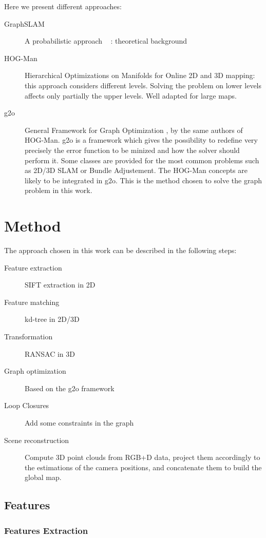 \documentclass[a4paper,11pt]{kth-mag}
\begin{document}
Here we present different approaches:
\begin{description}
\item[GraphSLAM] A probabilistic approach ~\cite{Thrun2005} : theoretical background
\item[HOG-Man] Hierarchical Optimizations on Manifolds for Online 2D and 3D mapping\cite{hogman2010}: this approach considers different levels. Solving the problem on lower levels affects only partially the upper levels. Well adapted for large maps.
\item[g2o] General Framework for Graph Optimization \cite{g2o2011}, by the same authors of HOG-Man\cite{hogman2010}. g2o is a framework which gives the possibility to redefine very precisely the error function to be minized and how the solver should perform it. Some classes are provided for the most common problems such as 2D/3D SLAM or Bundle Adjustement. The HOG-Man concepts are likely to be integrated in g2o. This is the method chosen to solve the graph problem in this work.
\end{description}

\chapter{Method}

The approach chosen in this work can be described in the following steps:
\begin{description}
\item[Feature extraction] SIFT extraction in 2D
\item[Feature matching] kd-tree in 2D/3D
\item[Transformation] RANSAC in 3D
\item[Graph optimization] Based on the g2o framework
\item[Loop Closures] Add some constraints in the graph
\item[Scene reconstruction] Compute 3D point clouds from RGB+D data, project them accordingly to the estimations of the camera positions, and concatenate them to build the global map.
\end{description}

\section{Features}
\subsection{Features Extraction}
\end{document}
